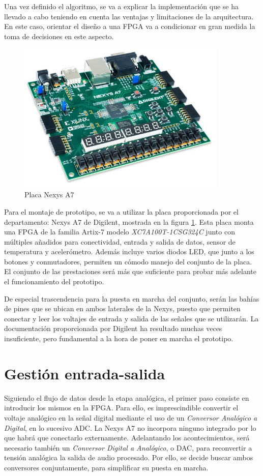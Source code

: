 Una vez definido el algoritmo, se va a explicar la implementación que se ha llevado a cabo teniendo en cuenta las ventajas y limitaciones de la arquitectura. En este caso, orientar el diseño a una FPGA va a condicionar en gran medida la toma de decisiones en este aspecto. 

\begin{figure}[!ht]
\begin{center}
\includegraphics[width=10cm]{img/nexysa7.jpg}
\caption{\label{fig:nexys}Placa Nexys A7}
\end{center}
\end{figure}

Para el montaje de prototipo, se va a utilizar la placa proporcionada por el departamento: Nexys A7 de Digilent, mostrada en la figura \ref{fig:nexys}. Esta placa monta una FPGA de la familia Artix-7 modelo \emph{XC7A100T-1CSG324C} junto con múltiples añadidos para conectividad, entrada y salida de datos, sensor de temperatura y acelerómetro. Además incluye varios diodos LED, que junto a los botones y conmutadores, permiten un cómodo manejo del conjunto de la placa. El conjunto de las prestaciones será más que suficiente para probar más adelante el funcionamiento del prototipo.

De especial trascendencia para la puesta en marcha del conjunto, serán las bahías de pines que se ubican en ambos laterales de la Nexys, puesto que permiten conectar y leer los voltajes de entrada y salida de las señales que se utilizarán. La documentación proporcionada por Digilent \cite{Nexys} ha resultado muchas veces insuficiente, pero fundamental a la hora de poner en marcha el prototipo.

\section{Gestión entrada-salida}
Siguiendo el flujo de datos desde la etapa analógica, el primer paso consiste en introducir los mismos en la FPGA. Para ello, es imprescindible convertir el voltaje analógico en la señal digital mediante el uso de un \emph{Conversor Analógico a Digital}, en lo sucesivo ADC. La Nexys A7 no incorpora ninguno integrado por lo que habrá que conectarlo externamente. Adelantando los acontecimientos, será necesario también un \emph{Conversor Digital a Analógico}, o DAC, para reconvertir a tensión analógica la salida de audio procesado. Por ello, se decide buscar ambos conversores conjuntamente, para simplificar su puesta en marcha.

